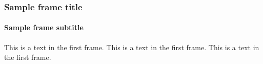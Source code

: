 \documentclass[10pt]{beamer}
\date{\today}
\begin{document}
	\frame{\maketitle}
	
	\begin{frame}
		\frametitle{Sample frame title}
		\framesubtitle{Sample frame subtitle}
		This is a text in the first frame. This is a text in the first frame. This is a text in the first frame.
	\end{frame}
\end{document}
